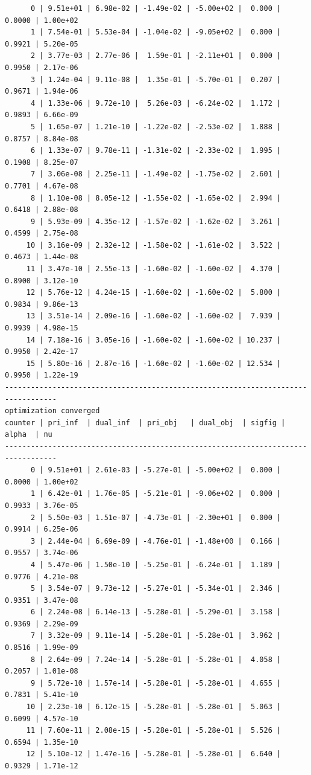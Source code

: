\documentclass[
]{book}
\begin{document}
\begin{verbatim}
      0 | 9.51e+01 | 6.98e-02 | -1.49e-02 | -5.00e+02 |  0.000 | 0.0000 | 1.00e+02
      1 | 7.54e-01 | 5.53e-04 | -1.04e-02 | -9.05e+02 |  0.000 | 0.9921 | 5.20e-05
      2 | 3.77e-03 | 2.77e-06 |  1.59e-01 | -2.11e+01 |  0.000 | 0.9950 | 2.17e-06
      3 | 1.24e-04 | 9.11e-08 |  1.35e-01 | -5.70e-01 |  0.207 | 0.9671 | 1.94e-06
      4 | 1.33e-06 | 9.72e-10 |  5.26e-03 | -6.24e-02 |  1.172 | 0.9893 | 6.66e-09
      5 | 1.65e-07 | 1.21e-10 | -1.22e-02 | -2.53e-02 |  1.888 | 0.8757 | 8.84e-08
      6 | 1.33e-07 | 9.78e-11 | -1.31e-02 | -2.33e-02 |  1.995 | 0.1908 | 8.25e-07
      7 | 3.06e-08 | 2.25e-11 | -1.49e-02 | -1.75e-02 |  2.601 | 0.7701 | 4.67e-08
      8 | 1.10e-08 | 8.05e-12 | -1.55e-02 | -1.65e-02 |  2.994 | 0.6418 | 2.88e-08
      9 | 5.93e-09 | 4.35e-12 | -1.57e-02 | -1.62e-02 |  3.261 | 0.4599 | 2.75e-08
     10 | 3.16e-09 | 2.32e-12 | -1.58e-02 | -1.61e-02 |  3.522 | 0.4673 | 1.44e-08
     11 | 3.47e-10 | 2.55e-13 | -1.60e-02 | -1.60e-02 |  4.370 | 0.8900 | 3.12e-10
     12 | 5.76e-12 | 4.24e-15 | -1.60e-02 | -1.60e-02 |  5.800 | 0.9834 | 9.86e-13
     13 | 3.51e-14 | 2.09e-16 | -1.60e-02 | -1.60e-02 |  7.939 | 0.9939 | 4.98e-15
     14 | 7.18e-16 | 3.05e-16 | -1.60e-02 | -1.60e-02 | 10.237 | 0.9950 | 2.42e-17
     15 | 5.80e-16 | 2.87e-16 | -1.60e-02 | -1.60e-02 | 12.534 | 0.9950 | 1.22e-19
----------------------------------------------------------------------------------
optimization converged
counter | pri_inf  | dual_inf  | pri_obj   | dual_obj  | sigfig | alpha  | nu 
----------------------------------------------------------------------------------
      0 | 9.51e+01 | 2.61e-03 | -5.27e-01 | -5.00e+02 |  0.000 | 0.0000 | 1.00e+02
      1 | 6.42e-01 | 1.76e-05 | -5.21e-01 | -9.06e+02 |  0.000 | 0.9933 | 3.76e-05
      2 | 5.50e-03 | 1.51e-07 | -4.73e-01 | -2.30e+01 |  0.000 | 0.9914 | 6.25e-06
      3 | 2.44e-04 | 6.69e-09 | -4.76e-01 | -1.48e+00 |  0.166 | 0.9557 | 3.74e-06
      4 | 5.47e-06 | 1.50e-10 | -5.25e-01 | -6.24e-01 |  1.189 | 0.9776 | 4.21e-08
      5 | 3.54e-07 | 9.73e-12 | -5.27e-01 | -5.34e-01 |  2.346 | 0.9351 | 3.47e-08
      6 | 2.24e-08 | 6.14e-13 | -5.28e-01 | -5.29e-01 |  3.158 | 0.9369 | 2.29e-09
      7 | 3.32e-09 | 9.11e-14 | -5.28e-01 | -5.28e-01 |  3.962 | 0.8516 | 1.99e-09
      8 | 2.64e-09 | 7.24e-14 | -5.28e-01 | -5.28e-01 |  4.058 | 0.2057 | 1.01e-08
      9 | 5.72e-10 | 1.57e-14 | -5.28e-01 | -5.28e-01 |  4.655 | 0.7831 | 5.41e-10
     10 | 2.23e-10 | 6.12e-15 | -5.28e-01 | -5.28e-01 |  5.063 | 0.6099 | 4.57e-10
     11 | 7.60e-11 | 2.08e-15 | -5.28e-01 | -5.28e-01 |  5.526 | 0.6594 | 1.35e-10
     12 | 5.10e-12 | 1.47e-16 | -5.28e-01 | -5.28e-01 |  6.640 | 0.9329 | 1.71e-12

\end{verbatim}
\end{document}
